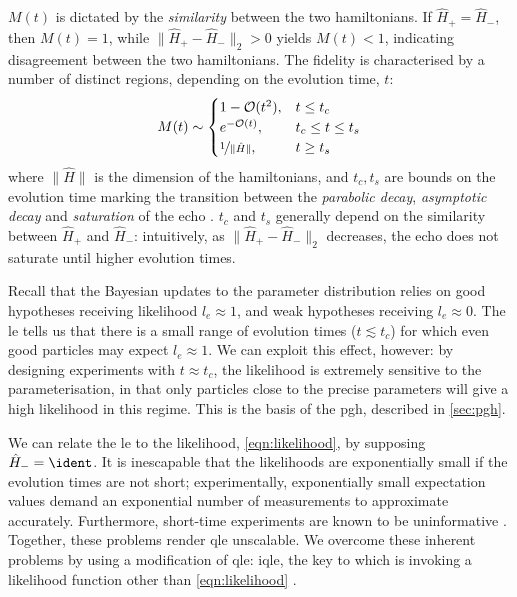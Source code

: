 $M(t)$ is dictated by the \emph{similarity} between the two \glspl{hamiltonian}.
If $\hat{H}_{+} = \hat{H}_{-}$, then $M(t) = 1$, while $\|\hat{H}_{+} - \hat{H}_{-} \|_2 > 0$ yields $M(t) < 1$, 
    indicating disagreement between the two \glspl{hamiltonian}. 
The fidelity is characterised by a number of distinct regions, depending on the evolution time, $t$:
\begin{align}
    \label{eqn:loschmidt_ranges}
    M(t) \sim 
    \begin{cases}
        1 - \mathcal{O}(t^2),  & t \leq t_c \\
        e^{-\mathcal{O}(t)}, & t_c \leq t \leq t_{s} \\
        \nicefrac{1}{\| \hat{H} \|}, & t \geq t_{s}
    \end{cases}
\end{align}
    where $\|\hat{H}\|$ is the dimension of the \glspl{hamiltonian}, and $t_c, t_{s}$ are bounds on the evolution time marking the transition between the 
    \emph{parabolic decay}, \emph{asymptotic decay} and \emph{saturation} of the echo \cite{goussev2012loschmidt}. 
$t_c$ and $t_s$ generally depend on the similarity between $\hat{H}_+$ and $\hat{H}_{-}$: 
    intuitively, as $\|\hat{H}_+ - \hat{H}_{-}\|_2$ decreases, the echo does not saturate until higher evolution times. 
\par 

Recall that the Bayesian updates to the parameter distribution relies on good hypotheses receiving likelihood $l_e \approx 1$,
    and weak hypotheses receiving $l_e \approx 0$. 
The \gls{le} tells us that there is a small range of evolution times ($t \lesssim t_c$) for which even good \glspl{particle} may expect $l_e \approx 1$.
We can exploit this effect, however: 
    by designing \glspl{experiment} with $t \approx t_c$, the likelihood is extremely sensitive to the parameterisation, 
    in that only \glspl{particle} close to the precise parameters will give a high likelihood in this regime. 
This is the basis of the \acrlong{pgh}, described in \cref{sec:pgh}. 
\par 

We can relate the \gls{le} to the likelihood, \cref{eqn:likelihood}, by supposing $\hat{H}_{-} = \ident$. 
It is inescapable that the \glspl{likelihood} are exponentially small if the evolution times are not short;
    experimentally, exponentially small \glspl{expectation value} demand an exponential number of measurements to approximate accurately.
Furthermore, short-time \glspl{experiment} are known to be uninformative \cite{wiebe2014qhlpra, wiebe2015quantum}.
Together, these problems render \gls{qle} unscalable.
We overcome these inherent problems by using a modification of \gls{qle}: \gls{iqle},
    the key to which is invoking a \gls{likelihood} function other than \cref{eqn:likelihood} \cite{Wiebe:2014qhl}.
    
